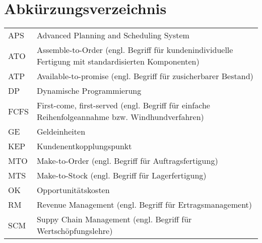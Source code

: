 \documentclass[a4paper,12pt,normalheadings,footexclude,headinclude,liststotoc,nochapterprefix,onecolumn,oneside,parskip,pointlessnumbers]{scrreprt}
\begin{document}
\chapter*{Abkürzungsverzeichnis}
\begin{table}[h!]
    \vspace*{-3mm}
    \hspace*{2mm}
  \renewcommand{\arraystretch}{1,5}
  \begin{flushleft}
    \begin{tabular}{lp{11.5cm}}  %
        APS & Advanced Planning and Scheduling System \\
        ATO & Assemble-to-Order (engl. Begriff für kundenindividuelle Fertigung mit standardisierten Komponenten)\\
        ATP & Available-to-promise (engl. Begriff für zusicherbarer Bestand)\\
        DP  			 & Dynamische Programmierung\\
        FCFS & First-come, first-served (engl. Begriff für einfache Reihenfolgeannahme bzw. Windhundverfahren) \\
        GE & Geldeinheiten \\
        KEP & Kundenentkopplungspunkt \\
     MTO & Make-to-Order (engl. Begriff für Auftragsfertigung) \\
     MTS & Make-to-Stock (engl. Begriff für Lagerfertigung)\\
     OK		    & Opportunitätskosten\\
     RM		    & Revenue Management (engl. Begriff für Ertragsmanagement)\\
     SCM & Suppy Chain Management (engl. Begriff für Wertschöpfungslehre) \\
	\end{tabular}
	\end{flushleft}
\end{table}

\end{document}
